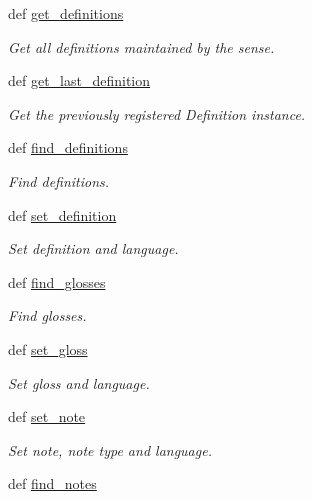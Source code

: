 \begin{DoxyCompactItemize}
def \hyperlink{classlmf_1_1src_1_1core_1_1sense_1_1_sense_a8bc5ca5fd053360b3150a13fa7787528}{get\+\_\+definitions}
\begin{DoxyCompactList}\small\item\em Get all definitions maintained by the sense. \end{DoxyCompactList}\item 
def \hyperlink{classlmf_1_1src_1_1core_1_1sense_1_1_sense_a9b51914a3abc0ebfd57501a665a69eb2}{get\+\_\+last\+\_\+definition}
\begin{DoxyCompactList}\small\item\em Get the previously registered Definition instance. \end{DoxyCompactList}\item 
def \hyperlink{classlmf_1_1src_1_1core_1_1sense_1_1_sense_aef07a87a7893b5daea9b6a5a84220cab}{find\+\_\+definitions}
\begin{DoxyCompactList}\small\item\em Find definitions. \end{DoxyCompactList}\item 
def \hyperlink{classlmf_1_1src_1_1core_1_1sense_1_1_sense_a5a033c526c8b56d4ddf8f2f55ba45dec}{set\+\_\+definition}
\begin{DoxyCompactList}\small\item\em Set definition and language. \end{DoxyCompactList}\item 
def \hyperlink{classlmf_1_1src_1_1core_1_1sense_1_1_sense_a784fe796429c439fadd5e070954d70b3}{find\+\_\+glosses}
\begin{DoxyCompactList}\small\item\em Find glosses. \end{DoxyCompactList}\item 
def \hyperlink{classlmf_1_1src_1_1core_1_1sense_1_1_sense_a2a344e07bebb6d87f711b93ebf711fae}{set\+\_\+gloss}
\begin{DoxyCompactList}\small\item\em Set gloss and language. \end{DoxyCompactList}\item 
def \hyperlink{classlmf_1_1src_1_1core_1_1sense_1_1_sense_a0eadc746a37849a966279d1c35f687fe}{set\+\_\+note}
\begin{DoxyCompactList}\small\item\em Set note, note type and language. \end{DoxyCompactList}\item 
def \hyperlink{classlmf_1_1src_1_1core_1_1sense_1_1_sense_acc1067bd6d9a28ac2719d8d442a8d7bb}{find\+\_\+notes}

\end{DoxyCompactItemize}
